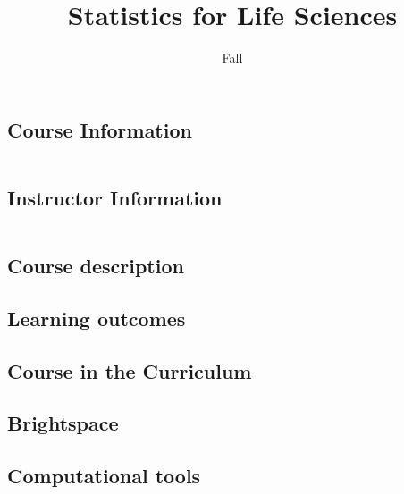 \documentclass[12pt]{files/handoutX}
\title{Statistics for Life Sciences}
\author{Fall \year}
\date{\bf  }
\begin{document}
\maketitle



\subsection*{Course Information}
\noindent\parbox{0.5\textwidth}{%
	\noindent\begin{tabular}{@{}ll}
		
\end{tabular}}


\subsection*{Instructor Information}
\noindent\parbox{0.5\textwidth}{%
	\noindent\begin{tabular}{@{}ll}
		
\end{tabular}}

\subsection*{Course description}


\subsection*{Learning outcomes}




\subsection*{Course in the Curriculum}



%

\subsection*{Brightspace}


\subsection*{Computational tools}

\end{document}
